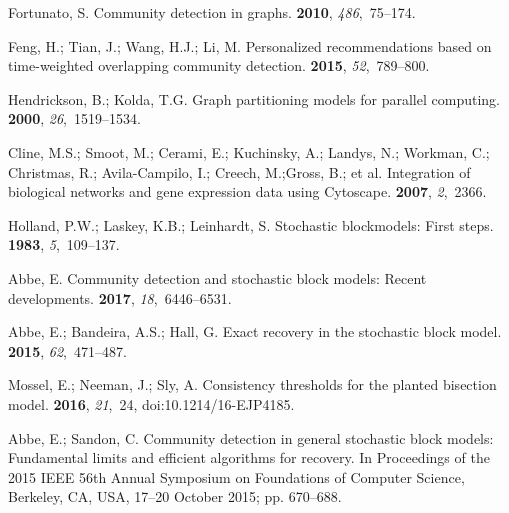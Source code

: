 \documentclass[entropy,article,accept,moreauthors,pdftex]{Definitions/mdpi}
\newcommand{\1}{\mathbbm{1}}
\begin{document}
\begin{thebibliography}{999}

Fortunato, S.
\newblock Community detection in graphs.
 {\bf 2010}, {\em 486},~75--174.

Feng, H.; Tian, J.; Wang, H.J.; Li, M.
\newblock Personalized recommendations based on time-weighted overlapping
  community detection.
 {\bf 2015}, {\em 52},~789--800.

Hendrickson, B.; Kolda, T.G.
\newblock Graph partitioning models for parallel computing.
 {\bf 2000}, {\em 26},~1519--1534.

Cline, M.S.; Smoot, M.; Cerami, E.; Kuchinsky, A.; Landys, N.; Workman, C.;
  Christmas, R.; Avila-Campilo, I.; Creech, M.;\linebreak Gross, B.; et al.
\newblock Integration of biological networks and gene expression data using
  Cytoscape.
 {\bf 2007}, {\em 2},~2366.

Holland, P.W.; Laskey, K.B.; Leinhardt, S.
\newblock Stochastic blockmodels: First steps.
 {\bf 1983}, {\em 5},~109--137.

Abbe, E.
\newblock Community detection and stochastic block models: Recent developments.
 {\bf 2017}, {\em
  18},~6446--6531.

Abbe, E.; Bandeira, A.S.; Hall, G.
\newblock Exact recovery in the stochastic block model.
 {\bf 2015}, {\em
  62},~471--487.

Mossel, E.; Neeman, J.; Sly, A.
\newblock Consistency thresholds for the planted bisection model.
 {\bf 2016}, {\em 21},~24, doi:10.1214/16-EJP4185.

Abbe, E.; Sandon, C.
\newblock Community detection in general stochastic block models: Fundamental limits and efficient algorithms for recovery.
\newblock  In Proceedings of the 2015 IEEE 56th Annual Symposium on Foundations of Computer Science, {Berkeley, CA, USA, 17--20 October} 2015; pp. 670--688.



\end{thebibliography}
\end{document}
